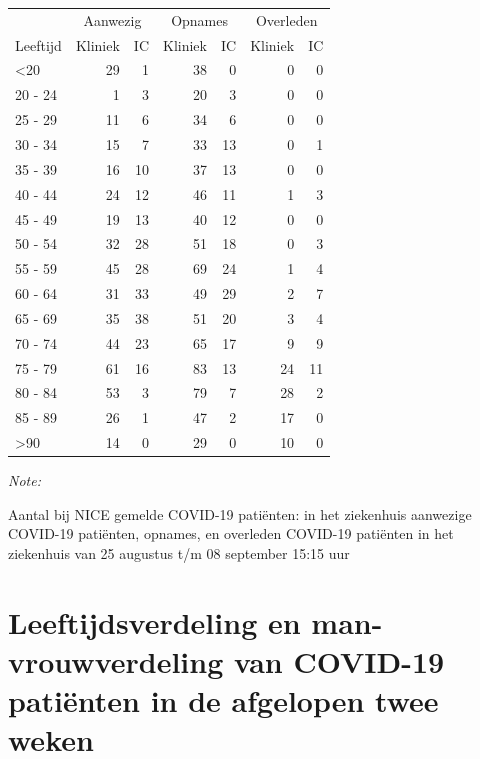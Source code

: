 \documentclass[
  english,
  man,floatsintext]{apa6}
\begin{document}
\begin{table}
\centering\begingroup\fontsize{10}{12}\selectfont

\begin{threeparttable}
\begin{tabular}{lrrrrrr}
\toprule
\multicolumn{1}{c}{ } & \multicolumn{2}{c}{Aanwezig} & \multicolumn{2}{c}{Opnames} & \multicolumn{2}{c}{Overleden} \\
\cmidrule(l{3pt}r{3pt}){2-3} \cmidrule(l{3pt}r{3pt}){4-5} \cmidrule(l{3pt}r{3pt}){6-7}
Leeftijd & Kliniek & IC & Kliniek & IC & Kliniek & IC\\
\midrule
<20 & 29 & 1 & 38 & 0 & 0 & 0\\
20 - 24 & 1 & 3 & 20 & 3 & 0 & 0\\
25 - 29 & 11 & 6 & 34 & 6 & 0 & 0\\
30 - 34 & 15 & 7 & 33 & 13 & 0 & 1\\
35 - 39 & 16 & 10 & 37 & 13 & 0 & 0\\
40 - 44 & 24 & 12 & 46 & 11 & 1 & 3\\
45 - 49 & 19 & 13 & 40 & 12 & 0 & 0\\
50 - 54 & 32 & 28 & 51 & 18 & 0 & 3\\
55 - 59 & 45 & 28 & 69 & 24 & 1 & 4\\
60 - 64 & 31 & 33 & 49 & 29 & 2 & 7\\
65 - 69 & 35 & 38 & 51 & 20 & 3 & 4\\
70 - 74 & 44 & 23 & 65 & 17 & 9 & 9\\
75 - 79 & 61 & 16 & 83 & 13 & 24 & 11\\
80 - 84 & 53 & 3 & 79 & 7 & 28 & 2\\
85 - 89 & 26 & 1 & 47 & 2 & 17 & 0\\
>90 & 14 & 0 & 29 & 0 & 10 & 0\\
\bottomrule
\end{tabular}
\begin{tablenotes}
\item \textit{Note: } 
\item Aantal bij NICE gemelde COVID-19 patiënten: in het ziekenhuis aanwezige COVID-19 patiënten, opnames, en overleden COVID-19 patiënten in het ziekenhuis van 25 augustus t/m 08 september 15:15 uur
\end{tablenotes}
\end{threeparttable}
\endgroup{}
\end{table}

\newpage

\hypertarget{leeftijdsverdeling-en-man-vrouwverdeling-van-covid-19-patiuxebnten-in-de-afgelopen-twee-weken}{%
\section{Leeftijdsverdeling en man-vrouwverdeling van COVID-19 patiënten in de afgelopen twee weken}\label{leeftijdsverdeling-en-man-vrouwverdeling-van-covid-19-patiuxebnten-in-de-afgelopen-twee-weken}}
\end{document}
